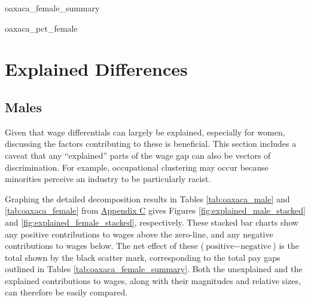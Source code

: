 \documentclass[class=article, crop=false]{standalone}
\begin{document}
{oaxaca_female_summary}

{oaxaca_pct_female}
\doublespacing


\section{Explained Differences}
\label{sec:explained_diff}
\subsection{Males}
\label{sec:male_explained}
Given that wage differentials can largely be explained, especially for women, discussing the factors contributing to these is beneficial. This section includes a caveat that any \enquote{explained} parts of the wage gap can also be vectors of discrimination. For example, occupational clustering may occur because minorities perceive an industry to be particularly racist. 

Graphing the detailed decomposition results in Tables \ref{tab:oaxaca_male} and \ref{tab:oaxaca_female} from \hyperref[sec:appendixC]{Appendix C} gives Figures \ref{fig:explained_male_stacked} and \ref{fig:explained_female_stacked}, respectively. These stacked bar charts show any positive contributions to wages above the zero-line, and any negative contributions to wages below. The net effect of these ($\text{positive}-\text{negative}$) is the total shown by the black scatter mark, corresponding to the total pay gaps outlined in Tables \ref{tab:oaxaca_female_summary}. Both the unexplained and the explained contributions to wages, along with their magnitudes and relative sizes, can therefore be easily compared.
\end{document}
